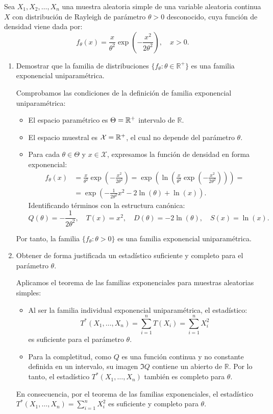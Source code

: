 \begin{ejercicio}
Sea $X_1, X_2, \ldots, X_n$ una muestra aleatoria simple de una variable aleatoria continua $X$ con distribución de Rayleigh de parámetro $\theta > 0$ desconocido, cuya función de densidad viene dada por:
\[
f_\theta(x) = \frac{x}{\theta^2} \exp\left( -\frac{x^2}{2\theta^2} \right), \quad x > 0.
\]

\begin{enumerate}
    \item Demostrar que la familia de distribuciones $\{f_\theta : \theta \in \mathbb{R}^+\}$ es una familia exponencial uniparamétrica.
    
    Comprobamos las condiciones de la definición de familia exponencial uniparamétrica:
    \begin{itemize}
        \item El espacio paramétrico es $\Theta = \mathbb{R}^+$ intervalo de $\mathbb{R}$.
        \item El espacio muestral es $\mathcal{X} = \mathbb{R}^+$, el cual no depende del parámetro $\theta$.
        \item Para cada $\theta \in \Theta$ y $x \in \mathcal{X}$, expresamos la función de densidad en forma exponencial:
        \begin{align*}
            f_\theta(x) &= \frac{x}{\theta^2} \exp\left( -\frac{x^2}{2\theta^2} \right) = \exp\left( \ln\left( \frac{x}{\theta^2} \exp\left( -\frac{x^2}{2\theta^2} \right) \right) \right) =\\&= \exp\left( -\frac{1}{2\theta^2} x^2 - 2\ln(\theta) + \ln(x) \right).
        \end{align*}
        Identificando términos con la estructura canónica:
        \[
        Q(\theta) = -\frac{1}{2\theta^2}, \quad T(x) = x^2, \quad D(\theta) = -2\ln(\theta), \quad S(x) = \ln(x).
        \]
    \end{itemize}
    Por tanto, la familia $\{f_\theta : \theta > 0\}$ es una familia exponencial uniparamétrica.

    \item Obtener de forma justificada un estadístico suficiente y completo para el parámetro $\theta$.
    
    Aplicamos el teorema de las familias exponenciales para muestras aleatorias simples:
    \begin{itemize}
        \item Al ser la familia individual exponencial uniparamétrica, el estadístico:
        \[
        T^*(X_1, \ldots, X_n) = \sum_{i=1}^n T(X_i) = \sum_{i=1}^n X_i^2
        \]
        es suficiente para el parámetro $\theta$.
        \item Para la completitud, como $Q$ es una función continua y no constante definida en un intervalo, su imagen $\Im Q$ contiene un abierto de $\mathbb{R}$. Por lo tanto, el estadístico $T^*(X_1, \ldots, X_n)$ también es completo para $\theta$.
    \end{itemize}
    En consecuencia, por el teorema de las familias exponenciales, el estadístico $\displaystyle T^*(X_1, \ldots, X_n) = \sum_{i=1}^n X_i^2$ es suficiente y completo para $\theta$.
\end{enumerate}
\end{ejercicio}


